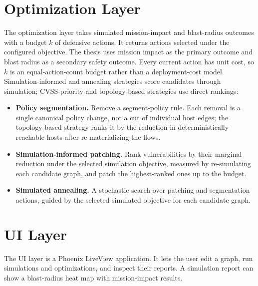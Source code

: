 \section{Optimization Layer}
\label{ch:design:opt}

The optimization layer takes simulated mission-impact and blast-radius outcomes with a budget $k$ of defensive actions. It returns actions selected under the configured objective. The thesis uses mission impact as the primary outcome and blast radius as a secondary safety outcome. Every current action has unit cost, so $k$ is an equal-action-count budget rather than a deployment-cost model. Simulation-informed and annealing strategies score candidates through simulation; CVSS-priority and topology-based strategies use direct rankings:

\begin{itemize}
	\item \textbf{Policy segmentation.} Remove a segment-policy rule. Each removal is a single canonical policy change, not a cut of individual host edges; the topology-based strategy ranks it by the reduction in deterministically reachable hosts after re-materializing the flows.
	\item \textbf{Simulation-informed patching.} Rank vulnerabilities by their marginal reduction under the selected simulation objective, measured by re-simulating each candidate graph, and patch the highest-ranked ones up to the budget.
	\item \textbf{Simulated annealing.} A stochastic search over patching and segmentation actions, guided by the selected simulated objective for each candidate graph.
\end{itemize}

\section{UI Layer}
\label{ch:design:ui}

The UI layer is a Phoenix LiveView application. It lets the user edit a graph, run simulations and optimizations, and inspect their reports. A simulation report can show a blast-radius heat map with mission-impact results.

